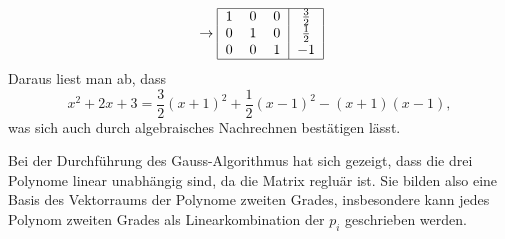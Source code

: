 \begin{loesung}
\begin{teilaufgaben}
\begin{align*}
\begin{tabular}{|ccc|c|}
\hline
\end{tabular}
\rightarrow
\begin{tabular}{|ccc|c|}
\hline
1&0&0&$\frac32$\\
0&1&0&$\frac12$\\
0&0&1&$-1$\\
\hline
\end{tabular}
\end{align*}
Daraus liest man ab, dass
\[
x^2+2x+3=\frac32(x+1)^2+\frac12(x-1)^2-(x+1)(x-1),
\]
was sich auch durch algebraisches Nachrechnen bestätigen lässt.
\item
Bei der Durchführung des Gauss-Algorithmus hat sich gezeigt, dass
die drei Polynome linear unabhängig sind, da die Matrix regluär
ist. Sie bilden also eine Basis des Vektorraums der Polynome zweiten
Grades, insbesondere kann jedes Polynom zweiten Grades als Linearkombination
der $p_i$ geschrieben werden.
\qedhere
\end{teilaufgaben}
\end{loesung}

